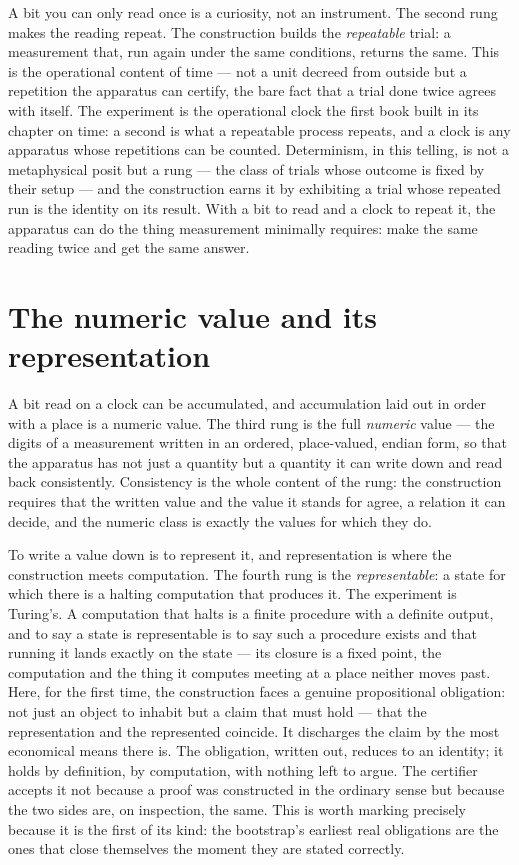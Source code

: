A bit you can only read once is a curiosity, not an instrument. The second rung makes the reading repeat.
The construction builds the \emph{repeatable} trial: a measurement that, run again under the same
conditions, returns the same. This is the operational content of time --- not a unit decreed from outside
but a repetition the apparatus can certify, the bare fact that a trial done twice agrees with itself. The
experiment is the operational clock the first book built in its chapter on time: a second is what a
repeatable process repeats, and a clock is any apparatus whose repetitions can be counted. Determinism, in
this telling, is not a metaphysical posit but a rung --- the class of trials whose outcome is fixed by
their setup --- and the construction earns it by exhibiting a trial whose repeated run is the identity on
its result. With a bit to read and a clock to repeat it, the apparatus can do the thing measurement
minimally requires: make the same reading twice and get the same answer.

\section{The numeric value and its representation}
\label{se:numeric-value-representation}

A bit read on a clock can be accumulated, and accumulation laid out in order with a place is a numeric
value. The third rung is the full \emph{numeric} value --- the digits of a measurement written in an
ordered, place-valued, endian form, so that the apparatus has not just a quantity but a quantity it can
write down and read back consistently. Consistency is the whole content of the rung: the construction
requires that the written value and the value it stands for agree, a relation it can decide, and the
numeric class is exactly the values for which they do.

To write a value down is to represent it, and representation is where the construction meets computation.
The fourth rung is the \emph{representable}: a state for which there is a halting computation that produces
it. The experiment is Turing's. A computation that halts is a finite procedure with a definite output, and
to say a state is representable is to say such a procedure exists and that running it lands exactly on the
state --- its closure is a fixed point, the computation and the thing it computes meeting at a place
neither moves past. Here, for the first time, the construction faces a genuine propositional obligation:
not just an object to inhabit but a claim that must hold --- that the representation and the represented
coincide. It discharges the claim by the most economical means there is. The obligation, written out,
reduces to an identity; it holds by definition, by computation, with nothing left to argue. The certifier
accepts it not because a proof was constructed in the ordinary sense but because the two sides are, on
inspection, the same. This is worth marking precisely because it is the first of its kind: the bootstrap's
earliest real obligations are the ones that close themselves the moment they are stated correctly.

